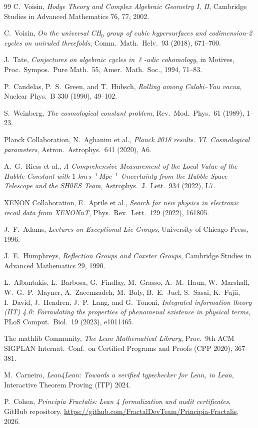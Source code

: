 \documentclass[11pt,a4paper]{amsart}
\theoremstyle{plain}
\theoremstyle{definition}
\begin{document}
\begin{thebibliography}{99}
 C.~Voisin, \emph{Hodge Theory and Complex Algebraic
Geometry I, II}, Cambridge Studies in Advanced Mathematics 76, 77, 2002.

 C.~Voisin, \emph{On the universal CH$_0$ group of
cubic hypersurfaces and codimension-2 cycles on uniruled threefolds},
Comm.~Math.~Helv.~93 (2018), 671--700.

 J.~Tate, \emph{Conjectures on algebraic cycles in
$\ell$-adic cohomology}, in Motives, Proc.~Sympos.~Pure Math.~55,
Amer.~Math.~Soc., 1994, 71--83.

 P.~Candelas, P.~S.~Green, and T.~H\"ubsch,
\emph{Rolling among Calabi--Yau vacua}, Nuclear Phys.~B 330 (1990),
49--102.

 S.~Weinberg, \emph{The cosmological constant
problem}, Rev.~Mod.~Phys.~61 (1989), 1--23.

 Planck Collaboration, N.~Aghanim et al.,
\emph{Planck 2018 results. VI. Cosmological parameters},
Astron.~Astrophys.~641 (2020), A6.

 A.~G.~Riess et al., \emph{A Comprehensive Measurement
of the Local Value of the Hubble Constant with $1$ km\,s$^{-1}$\,Mpc$^{-1}$
Uncertainty from the Hubble Space Telescope and the SH0ES Team},
Astrophys.~J.~Lett.~934 (2022), L7.

 XENON Collaboration, E.~Aprile et al.,
\emph{Search for new physics in electronic recoil data from XENONnT},
Phys.~Rev.~Lett.~129 (2022), 161805.

 J.~F.~Adams, \emph{Lectures on Exceptional Lie
Groups}, University of Chicago Press, 1996.

 J.~E.~Humphreys, \emph{Reflection Groups and
Coxeter Groups}, Cambridge Studies in Advanced Mathematics 29, 1990.

 L.~Albantakis, L.~Barbosa, G.~Findlay,
M.~Grasso, A.~M.~Haun, W.~Marshall, W.~G.~P.~Mayner, A.~Zaeemzadeh,
M.~Boly, B.~E.~Juel, S.~Sasai, K.~Fujii, I.~David, J.~Hendren,
J.~P.~Lang, and G.~Tononi, \emph{Integrated information theory (IIT) 4.0:
Formulating the properties of phenomenal existence in physical terms},
PLoS Comput.~Biol.~19 (2023), e1011465.

 The mathlib Community, \emph{The Lean Mathematical
Library}, Proc.~9th ACM SIGPLAN Internat.~Conf.~on Certified Programs
and Proofs (CPP 2020), 367--381.

 M.~Carneiro, \emph{Lean4Lean: Towards a verified
typechecker for Lean, in Lean}, Interactive Theorem Proving (ITP) 2024.

 P.~Cohen, \emph{Principia Fractalis:
Lean 4 formalization and audit certificates}, GitHub repository,
\url{https://github.com/FractalDevTeam/Principia-Fractalis}, 2026.

\end{thebibliography}
\end{document}

